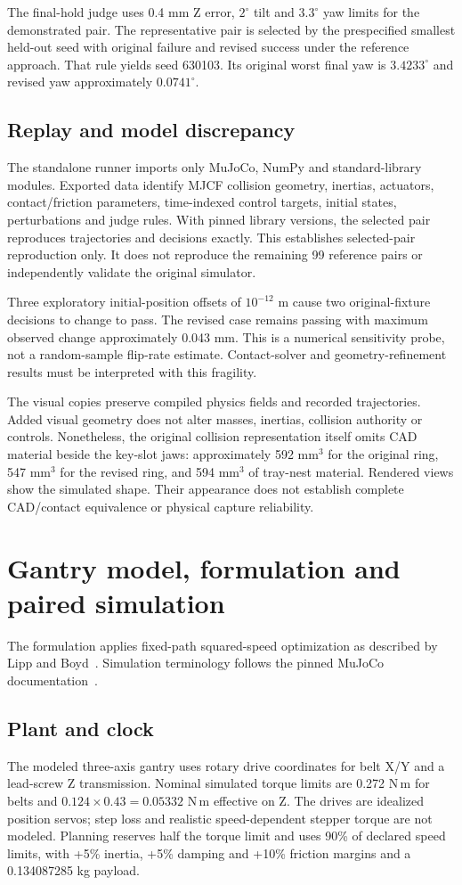 The final-hold judge uses 0.4 mm Z error, $2^\circ$ tilt and $3.3^\circ$ yaw limits for the demonstrated pair. The representative pair is selected by the prespecified smallest held-out seed with original failure and revised success under the reference approach. That rule yields seed 630103. Its original worst final yaw is $3.4233^\circ$ and revised yaw approximately $0.0741^\circ$.

\subsection{Replay and model discrepancy}
The standalone runner imports only MuJoCo, NumPy and standard-library modules. Exported data identify MJCF collision geometry, inertias, actuators, contact/friction parameters, time-indexed control targets, initial states, perturbations and judge rules. With pinned library versions, the selected pair reproduces trajectories and decisions exactly. This establishes selected-pair reproduction only. It does not reproduce the remaining 99 reference pairs or independently validate the original simulator.

Three exploratory initial-position offsets of $10^{-12}$ m cause two original-fixture decisions to change to pass. The revised case remains passing with maximum observed change approximately 0.043 mm. This is a numerical sensitivity probe, not a random-sample flip-rate estimate. Contact-solver and geometry-refinement results must be interpreted with this fragility.

The visual copies preserve compiled physics fields and recorded trajectories. Added visual geometry does not alter masses, inertias, collision authority or controls. Nonetheless, the original collision representation itself omits CAD material beside the key-slot jaws: approximately 592 mm$^3$ for the original ring, 547 mm$^3$ for the revised ring, and 594 mm$^3$ of tray-nest material. Rendered views show the simulated shape. Their appearance does not establish complete CAD/contact equivalence or physical capture reliability.

\section{Gantry model, formulation and paired simulation}
The formulation applies fixed-path squared-speed optimization as described by Lipp and Boyd~\cite{lipp2014minimum}. Simulation terminology follows the pinned MuJoCo documentation~\cite{mujocodocs3150}.
\subsection{Plant and clock}
The modeled three-axis gantry uses rotary drive coordinates for belt X/Y and a lead-screw Z transmission. Nominal simulated torque limits are 0.272 N\,m for belts and $0.124\times0.43=0.05332$ N\,m effective on Z. The drives are idealized position servos; step loss and realistic speed-dependent stepper torque are not modeled. Planning reserves half the torque limit and uses 90\% of declared speed limits, with +5\% inertia, +5\% damping and +10\% friction margins and a 0.134087285 kg payload.

